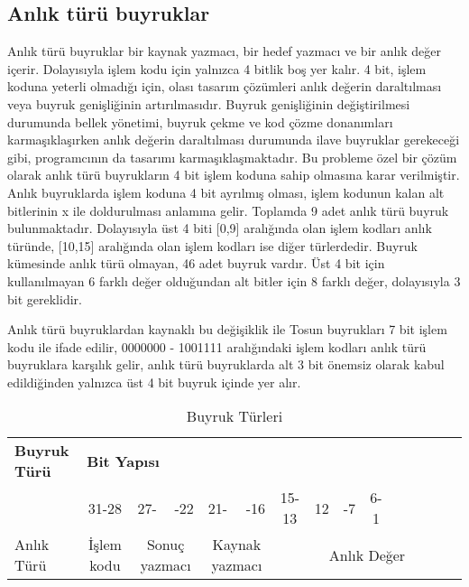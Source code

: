 \subsection{Anlık türü buyruklar}
Anlık türü buyruklar bir kaynak yazmacı, bir hedef yazmacı ve bir anlık değer içerir. Dolayısıyla işlem kodu için yalnızca 4 bitlik boş yer kalır. 4 bit, işlem koduna yeterli olmadığı için, olası tasarım çözümleri anlık değerin daraltılması veya buyruk genişliğinin artırılmasıdır. Buyruk genişliğinin değiştirilmesi durumunda bellek yönetimi, buyruk çekme ve kod çözme donanımları karmaşıklaşırken anlık değerin daraltılması durumunda ilave buyruklar gerekeceği gibi, programcının da tasarımı karmaşıklaşmaktadır. Bu probleme özel bir çözüm olarak anlık türü buyrukların 4 bit işlem koduna sahip olmasına karar verilmiştir. Anlık buyruklarda işlem koduna 4 bit ayrılmış olması, işlem kodunun kalan alt bitlerinin x ile doldurulması anlamına gelir. Toplamda 9 adet anlık türü buyruk bulunmaktadır. Dolayısıyla üst 4 biti [0,9] aralığında olan işlem kodları anlık türünde, [10,15] aralığında olan işlem kodları ise diğer türlerdedir. Buyruk kümesinde anlık türü olmayan, 46 adet buyruk vardır. Üst 4 bit için kullanılmayan 6 farklı değer olduğundan alt bitler için 8 farklı değer, dolayısıyla 3 bit gereklidir. \par

Anlık türü buyruklardan kaynaklı bu değişiklik ile Tosun buyrukları 7 bit işlem kodu ile ifade edilir, 0000000 - 1001111 aralığındaki işlem kodları anlık türü buyruklara karşılık gelir, anlık türü buyruklarda alt 3 bit önemsiz olarak kabul edildiğinden yalnızca üst 4 bit buyruk içinde yer alır.\par

\begin{longtable}{p{130pt} p{10pt} p{10pt} p{10pt} p{10pt} p{10pt} p{10pt} p{10pt} p{10pt} p{10pt} p{10pt} p{10pt} p{10pt} p{10pt} p{10pt} p{10pt} p{10pt} p{10pt} p{10pt} p{10pt} p{10pt} p{10pt} p{10pt} p{10pt} p{10pt} p{10pt} p{10pt} p{10pt} p{10pt} p{10pt} p{10pt} p{10pt} p{10pt}}
\caption{Buyruk Türleri} \label{table:NVidiaRegisterUsage} \\
\multicolumn{1}{l}{\textbf{Buyruk Türü}} & \multicolumn{32}{l}{\textbf{Bit Yapısı}}  \\ 
\multicolumn{1}{l}{} & \multicolumn{4}{c}{31-28} & \multicolumn{3}{l}{27-} & \multicolumn{3}{r}{-22} & \multicolumn{3}{l}{21-} & \multicolumn{3}{r}{-16} & \multicolumn{3}{c}{15-13} & \multicolumn{1}{c}{12} & \multicolumn{1}{r}{-7} & \multicolumn{6}{c}{6-1}   \\ 
\hline 
\endfirsthead
Anlık Türü & \multicolumn{4}{c}{İşlem kodu} & \multicolumn{6}{c}{Sonuç yazmacı} & \multicolumn{6}{c}{Kaynak yazmacı} & \multicolumn{16}{c}{Anlık Değer}
\end{longtable}


